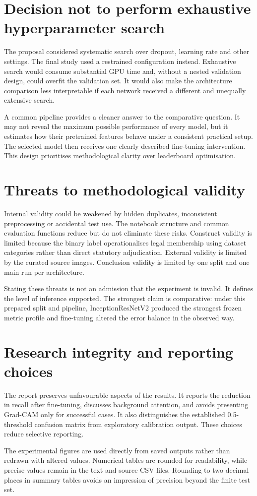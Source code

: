 \section{Decision not to perform exhaustive hyperparameter search}
The proposal considered systematic search over dropout, learning rate and other settings. The final study used a restrained configuration instead. Exhaustive search would consume substantial GPU time and, without a nested validation design, could overfit the validation set. It would also make the architecture comparison less interpretable if each network received a different and unequally extensive search.

A common pipeline provides a cleaner answer to the comparative question. It may not reveal the maximum possible performance of every model, but it estimates how their pretrained features behave under a consistent practical setup. The selected model then receives one clearly described fine-tuning intervention. This design prioritises methodological clarity over leaderboard optimisation.

\section{Threats to methodological validity}
Internal validity could be weakened by hidden duplicates, inconsistent preprocessing or accidental test use. The notebook structure and common evaluation functions reduce but do not eliminate these risks. Construct validity is limited because the binary label operationalises legal membership using dataset categories rather than direct statutory adjudication. External validity is limited by the curated source images. Conclusion validity is limited by one split and one main run per architecture.

Stating these threats is not an admission that the experiment is invalid. It defines the level of inference supported. The strongest claim is comparative: under this prepared split and pipeline, InceptionResNetV2 produced the strongest frozen metric profile and fine-tuning altered the error balance in the observed way.

\section{Research integrity and reporting choices}
The report preserves unfavourable aspects of the results. It reports the reduction in recall after fine-tuning, discusses background attention, and avoids presenting Grad-CAM only for successful cases. It also distinguishes the established 0.5-threshold confusion matrix from exploratory calibration output. These choices reduce selective reporting.

The experimental figures are used directly from saved outputs rather than redrawn with altered values. Numerical tables are rounded for readability, while precise values remain in the text and source CSV files. Rounding to two decimal places in summary tables avoids an impression of precision beyond the finite test set.
